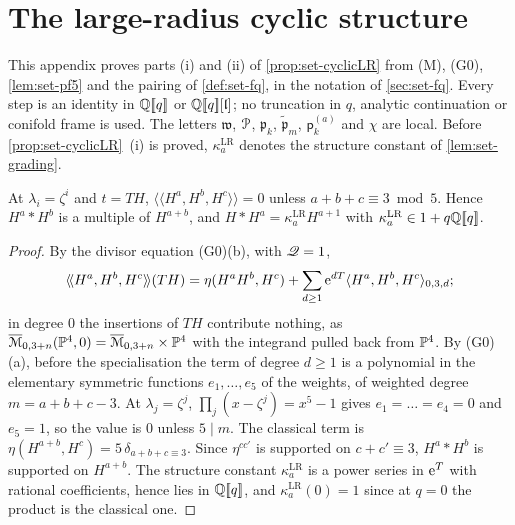 \section{The large-radius cyclic structure}
\label{sec:set-lrproof}

This appendix proves parts (i) and (ii) of \cref{prop:set-cyclicLR} from (M), (G0), \cref{lem:set-pf5} and the pairing of \cref{def:set-fq}, in the notation of \cref{sec:set-fq}. Every step is an identity in $\mathbb{Q}[\![ q ]\!]$ or $\mathbb{Q}[\![ q ]\!][\mathfrak{l}]$; no truncation in $q$, analytic continuation or conifold frame is used. The letters $\mathfrak w$, $\mathcal{P}$, $\mathfrak p_k$, $\tilde{\mathfrak p}_m$, $\mathsf p^{(a)}_k$ and $\chi$ are local. Before \cref{prop:set-cyclicLR}~(i) is proved, $\kappa^{\mathrm{LR}}_a$ denotes the structure constant of \cref{lem:set-grading}.

\begin{lem}
\label{lem:set-grading}
At $\lambda_i=\zeta^i$ and $t=TH$, $\langle\!\langle H^a,H^b,H^c\rangle\!\rangle=0$ unless $a+b+c\equiv3\bmod5$. Hence $H^a*H^b$ is a multiple of $H^{a+b}$, and $H*H^a=\kappa^{\mathrm{LR}}_aH^{a+1}$ with $\kappa^{\mathrm{LR}}_a\in1+q\mathbb{Q}[\![ q ]\!]$.
\end{lem}

\begin{proof}
By the divisor equation (G0)(b), with $\mathscr{Q}=1$,
\[
\langle\!\langle H^a,H^b,H^c\rangle\!\rangle(TH)=\eta(H^aH^b,H^c)+\sum_{d\geq1}\mathrm{e}^{dT}\langle H^a,H^b,H^c\rangle_{0,3,d};
\]
in degree $0$ the insertions of $TH$ contribute nothing, as $\overline{\mathcal M}_{0,3+n}(\mathbb{P}^4,0)=\overline{\mathcal M}_{0,3+n}\times\mathbb{P}^4$ with the integrand pulled back from $\mathbb{P}^4$. By (G0)(a), before the specialisation the term of degree $d\geq1$ is a polynomial in the elementary symmetric functions $e_1,\dots,e_5$ of the weights, of weighted degree $m=a+b+c-3$. At $\lambda_j=\zeta^j$, $\prod_j(x-\zeta^j)=x^5-1$ gives $e_1=\dots=e_4=0$ and $e_5=1$, so the value is $0$ unless $5\mid m$. The classical term is $\eta(H^{a+b},H^c)=5\,\delta_{a+b+c\equiv3}$. Since $\eta^{cc'}$ is supported on $c+c'\equiv3$, $H^a*H^b$ is supported on $H^{a+b}$. The structure constant $\kappa^{\mathrm{LR}}_a$ is a power series in $\mathrm{e}^T$ with rational coefficients, hence lies in $\mathbb{Q}[\![ q ]\!]$, and $\kappa^{\mathrm{LR}}_a(0)=1$ since at $q=0$ the product is the classical one.
\end{proof}

